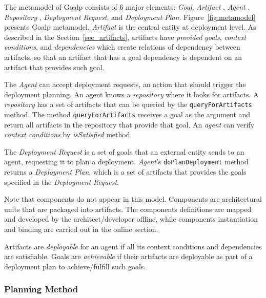The metamodel of Goalp consists of 6 major elements: \emph{Goal}, \emph{Artifact} , \emph{Agent} ,  \emph{Repository} , \emph{Deployment Request}, and \emph{Deployment Plan}. Figure~\ref{fig:metamodel} presents Goalp metamodel.  \emph{Artifact} is the central entity at deployment level. As described in the Section~\ref{sec_artifacts}, artifacts have \emph{provided goals}, \emph{context conditions}, and \emph{dependencies} which create relations of dependency between artifacts, so that an artifact that has a goal dependency is dependent on an artifact that provides such goal. %

The \emph{Agent} can accept deployment requests, an action that should trigger the deployment planning. An agent knows a \emph{repository} where it looks for artifacts.
A \emph{repository} has a set of artifacts that can be queried by the \texttt{queryForArtifacts} method. The method \texttt{queryForArtifacts} receives a goal as the argument and return all artifacts in the repository that provide that goal. An \emph{agent} can verify \emph{context conditions} by \emph{isSatisfied} method.

The \emph{Deployment Request} is a set of goals that an external entity sends to an agent, requesting it to plan a deployment. \emph{Agent}’s \texttt{doPlanDeployment} method returns a \emph{Deployment Plan}, which is a set of  artifacts that provides the goals specified in the \emph{Deployment Request}.

Note that components do not appear in this model. Components are architectural units that are packaged into artifacts. The components definitions are mapped and developed by the architect/developer offline, while components instantiation and binding are carried out in the online section.

Artifacts are \emph{deployable} for an agent if all its context conditions and dependencies are satisfiable.
Goals are \emph{achievable} if their artifacts are deployable as part of a deployment plan to achieve/fulfill such goals.


\subsubsection{Planning Method}
\label{sec:algorithm}


